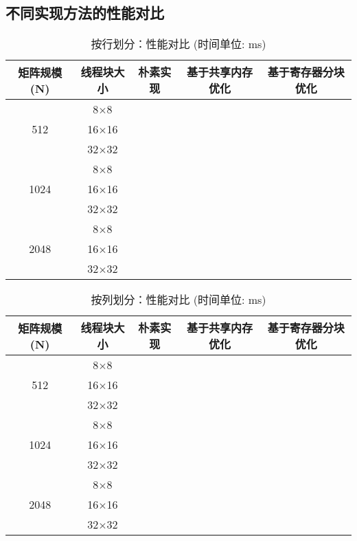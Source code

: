 \documentclass{SYSUReport}
\begin{document}
\subsection{不同实现方法的性能对比}
\begin{table}[H] %
\centering
\caption{按行划分：性能对比 (时间单位: ms)}
\label{tab:perf_combined}
\begin{tabular}{|c|c|c|c|c|}
\hline
矩阵规模 (N) & 线程块大小 & 朴素实现 & 基于共享内存优化 & 基于寄存器分块优化 \\
\hline
\multirow{3}{*}{512} & 8$\times$8 &       &       &       \\ %
\cline{2-5}
& 16$\times$16 &       &       &       \\
\cline{2-5}
& 32$\times$32 &       &       &       \\
\hline
\multirow{3}{*}{1024} & 8$\times$8 &       &       &       \\
\cline{2-5}
& 16$\times$16 &       &       &       \\
\cline{2-5}
& 32$\times$32 &       &       &       \\
\hline
\multirow{3}{*}{2048} & 8$\times$8 &       &       &       \\
\cline{2-5}
& 16$\times$16 &       &       &       \\
\cline{2-5}
& 32$\times$32 &       &       &       \\
\hline
\end{tabular}
\end{table}
\begin{table}[H] %
\centering
\caption{按列划分：性能对比 (时间单位: ms)}
\label{tab:perf_combined}
\begin{tabular}{|c|c|c|c|c|}
\hline
矩阵规模 (N) & 线程块大小 & 朴素实现 & 基于共享内存优化 & 基于寄存器分块优化 \\
\hline
\multirow{3}{*}{512} & 8$\times$8 &       &       &       \\ %
\cline{2-5}
& 16$\times$16 &       &       &       \\
\cline{2-5}
& 32$\times$32 &       &       &       \\
\hline
\multirow{3}{*}{1024} & 8$\times$8 &       &       &       \\
\cline{2-5}
& 16$\times$16 &       &       &       \\
\cline{2-5}
& 32$\times$32 &       &       &       \\
\hline
\multirow{3}{*}{2048} & 8$\times$8 &       &       &       \\
\cline{2-5}
& 16$\times$16 &       &       &       \\
\cline{2-5}
& 32$\times$32 &       &       &       \\
\hline
\end{tabular}
\end{table}
\end{document}
